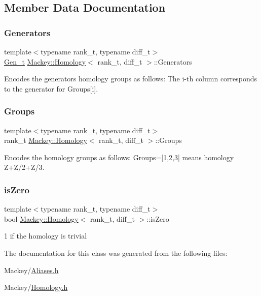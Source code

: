 \subsection{Member Data Documentation}
\mbox{\label{classMackey_1_1Homology_af3eff7d2cb42b44a29f6a92172096b3d}} 
\subsubsection{\texorpdfstring{Generators}{Generators}}
{\footnotesize\ttfamily template$<$typename rank\+\_\+t, typename diff\+\_\+t$>$ \\
\hyperlink{classMackey_1_1Homology_a9a8e354083ac094720820a5ff6bcff03}{Gen\+\_\+t} \hyperlink{classMackey_1_1Homology}{Mackey\+::\+Homology}$<$ rank\+\_\+t, diff\+\_\+t $>$\+::Generators}



Encodes the generators homology groups as follows\+: The i-\/th column corresponds to the generator for Groups\mbox{[}i\mbox{]}. 

\mbox{\label{classMackey_1_1Homology_aaae78e6463ce6e60e7f4c5861304bc5b}} 
\subsubsection{\texorpdfstring{Groups}{Groups}}
{\footnotesize\ttfamily template$<$typename rank\+\_\+t, typename diff\+\_\+t$>$ \\
rank\+\_\+t \hyperlink{classMackey_1_1Homology}{Mackey\+::\+Homology}$<$ rank\+\_\+t, diff\+\_\+t $>$\+::Groups}



Encodes the homology groups as follows\+: Groups=\mbox{[}1,2,3\mbox{]} means homology Z+\+Z/2+\+Z/3. 

\mbox{\label{classMackey_1_1Homology_ae3bb3781bab2b5884295e04a8fddf36e}} 
\subsubsection{\texorpdfstring{is\+Zero}{isZero}}
{\footnotesize\ttfamily template$<$typename rank\+\_\+t, typename diff\+\_\+t$>$ \\
bool \hyperlink{classMackey_1_1Homology}{Mackey\+::\+Homology}$<$ rank\+\_\+t, diff\+\_\+t $>$\+::is\+Zero}



1 if the homology is trivial 



The documentation for this class was generated from the following files\+:\begin{DoxyCompactItemize}
\item 
Mackey/\hyperlink{Aliases_8h}{Aliases.\+h}\item 
Mackey/\hyperlink{Homology_8h}{Homology.\+h}\end{DoxyCompactItemize}
